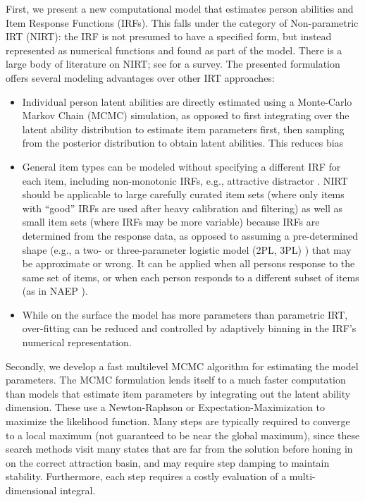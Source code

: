 \documentclass{article}
\begin{document}
First, we present a new computational model that estimates person abilities and Item Response Functions (IRFs). This falls under the category of Non-parametric IRT (NIRT): the IRF is not presumed to have a specified form, but instead represented as numerical functions and found as part of the model. There is a large body of literature on NIRT; see \cite{sijtsma} for a survey. The presented formulation offers several modeling advantages over other IRT approaches:
\begin{itemize}
	\item Individual person latent abilities are directly estimated using a Monte-Carlo 
	Markov Chain (MCMC) simulation, as opposed to first integrating over the latent ability distribution to estimate item parameters first, then sampling from the posterior distribution to obtain latent abilities. This reduces bias
	\item General item types can be modeled without specifying a different IRF for each item,
	including non-monotonic IRFs, e.g., attractive distractor \cite{attractive_distractor}. NIRT should be applicable to large carefully curated item sets (where only items with ``good'' IRFs are used after heavy calibration and filtering) as well as small item sets (where IRFs may be more variable) because IRFs are determined from the response data, as opposed to assuming a pre-determined shape (e.g., a two- or three-parameter logistic model (2PL, 3PL) \cite{junker}) that may be approximate or wrong. It can be applied when all persons response to the same set of items, or when each person responds to a different subset of items (as in NAEP \cite{matt02}).
	\item While on the surface the model has more parameters than parametric IRT, over-fitting can be reduced and controlled by adaptively binning in the IRF's numerical representation.
\end{itemize}

Secondly, we develop a fast multilevel MCMC algorithm for estimating the model parameters. The MCMC formulation lends itself to a much faster computation than models that estimate item parameters by integrating out the latent ability dimension. These use a Newton-Raphson \cite{haberman} or Expectation-Maximization to maximize the likelihood function. Many steps are typically required to converge to a local maximum (not guaranteed to be near the global maximum), since these search methods visit many states that are far from the solution before honing in on the correct attraction basin, and may require step damping to maintain stability. Furthermore, each step requires a costly evaluation of a multi-dimensional integral.
\end{document}
